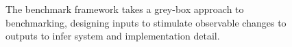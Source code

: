 \begin{figure}[h!]
    \begin{center}
        
        \caption{The \gai benchmark framework takes a grey-box approach to benchmarking, designing inputs to stimulate observable changes to outputs to infer system and implementation detail.}
        \label{Figure:grey-box}
    \end{center}
\end{figure}

